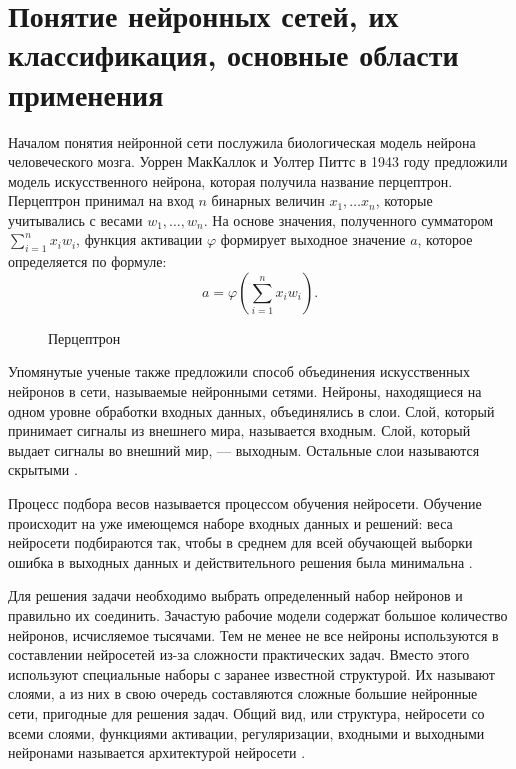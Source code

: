 \chapter{Понятие нейронных сетей, их классификация, основные области применения}
Началом понятия нейронной сети послужила биологическая модель нейрона человеческого мозга.
Уоррен МакКаллок и Уолтер Питтс  в 1943 году предложили модель искусственного нейрона, 
которая получила название перцептрон. 
Перцептрон принимал на вход $n$ бинарных величин $x_1, \dots x_n$,
которые учитывались с весами $w_1, \dots, w_n$. На основе значения, полученного сумматором $\sum_{i=1}^n x_i w_i$, функция активации
$\varphi$ формирует выходное значение $a$, которое определяется по формуле:
\begin{equation}
    a = \varphi \left( \sum\limits_{i=1}^n x_i w_i \right).
\end{equation}

\begin{figure}[H]
	\caption{Перцептрон}
\end{figure}

Упомянутые ученые также предложили способ объединения искусственных нейронов в сети, называемые нейронными сетями.
Нейроны, находящиеся на одном уровне обработки входных данных, объединялись в слои.
Слой, который принимает сигналы из внешнего мира, называется входным. Слой, который выдает сигналы во внешний мир, —
выходным. Остальные слои называются скрытыми \cite{sozykin}.

Процесс подбора весов называется процессом обучения нейросети.
Обучение происходит на уже имеющемся наборе входных данных и
решений: веса нейросети подбираются так, чтобы в среднем для всей
обучающей выборки ошибка в выходных данных и действительного
решения была минимальна \cite{cyber_alex}.

Для решения задачи необходимо выбрать определенный набор
нейронов и правильно их соединить. Зачастую рабочие модели содержат большое количество нейронов, исчисляемое тысячами.
Тем не менее не все нейроны используются в составлении нейросетей из-за сложности практических задач. Вместо этого используют специальные
наборы с заранее известной структурой. Их называют слоями, а из них в
свою очередь составляются сложные большие нейронные сети, пригодные
для решения задач. Общий вид, или структура, нейросети со всеми слоями,
функциями активации, регуляризации, входными и выходными нейронами
называется архитектурой нейросети \cite{cyber_alex}.

